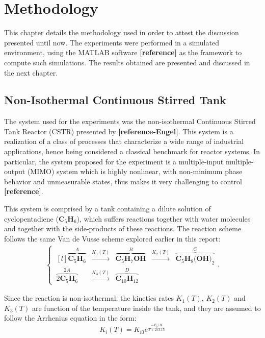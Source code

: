 \documentclass[a4paper,11pt]{book}
\numberwithin{figure}{chapter}
\numberwithin{equation}{chapter}
\numberwithin{table}{chapter}
\theoremstyle{definition}
\begin{document}
\clearpage
\chapter{Methodology}

This chapter details the methodology used in order to attest the discussion presented until now. The experiments were performed in a simulated environment, using the MATLAB software \textbf{[reference]} as the framework to compute such simulations. The results obtained are presented and discussed in the next chapter.   

\section{Non-Isothermal Continuous Stirred Tank}

The system used for the experiments was the non-isothermal Continuous Stirred Tank Reactor (CSTR) presented by \textbf{[reference-Engel]}. This system is a realization of a class of processes that characterize a wide range of industrial applications, hence being considered a classical benchmark for reactor systems. In particular, the system proposed for the experiment is a multiple-input multiple-output (MIMO) system which is highly nonlinear, with non-minimum phase behavior and unmeasurable states, thus makes it very challenging to control \textbf{[reference]}. 

This system is comprised by a tank containing a dilute solution of cyclopentadiene ($\textbf{C}_5 \textbf{H}_6$), which suffers reactions together with water molecules and together with the side-products of these reactions. The reaction scheme follows the same Van de Vusse scheme explored earlier in this report:
\begin{align}
\left\{\ \begin{matrix*}[l]
	\overbrace{\textbf{C}_5 \textbf{H}_6}^{A} & \overset{K_1(T)}{\longrightarrow} & \overbrace{\textbf{C}_5 \textbf{H}_7 \textbf{OH}}^{B} & \overset{K_2(T)}{\longrightarrow} & \overbrace{\textbf{C}_5 \textbf{H}_8 \textbf{(OH)}_2}^{C} \\ 
	\overbrace{2 \textbf{C}_5 \textbf{H}_6}^{2A} & \overset{K_3(T)}{\longrightarrow} & \overbrace{\textbf{C}_10 \textbf{H}_12}^{D}
\end{matrix*} \right.
.\end{align}

Since the reaction is non-isothermal, the kinetics rates $K_1(T)$, $K_2(T)$ and $K_3(T)$ are function of the temperature inside the tank, and they are assumed to follow the Arrhenius equation in the form:
\begin{equation}
	K_{i}(T) = K_{i0} e^{\frac{-E_i / R}{T+273.15}}
\end{equation}
\end{document}

